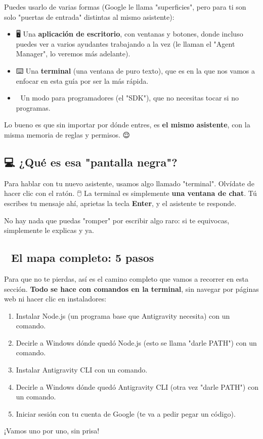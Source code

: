 \documentclass[12pt]{article}
\begin{document}
Puedes usarlo de varias formas (Google le llama "superficies", pero para ti son solo "puertas de entrada" distintas al mismo asistente):
\begin{itemize}
    \item 🖥️ Una \textbf{aplicación de escritorio}, con ventanas y botones, donde incluso puedes ver a varios ayudantes trabajando a la vez (le llaman el "Agent Manager", lo veremos más adelante).
    \item ⌨️ Una \textbf{terminal} (una ventana de puro texto), que es en la que nos vamos a enfocar en esta guía por ser la más rápida.
    \item 🧩 Un modo para programadores (el "SDK"), que no necesitas tocar si no programas.
\end{itemize}
Lo bueno es que sin importar por dónde entres, es \textbf{el mismo asistente}, con la misma memoria de reglas y permisos. 😌

\subsection{💻 ¿Qué es esa "pantalla negra"?}
Para hablar con tu nuevo asistente, usamos algo llamado "terminal". Olvídate de hacer clic con el ratón. 🖱️ La terminal es simplemente \textbf{una ventana de chat}. Tú escribes tu mensaje ahí, aprietas la tecla \textbf{Enter}, y el asistente te responde. 💬

No hay nada que puedas "romper" por escribir algo raro: si te equivocas, simplemente le explicas y ya. 🙂

\subsection{🧭 El mapa completo: 5 pasos}
Para que no te pierdas, así es el camino completo que vamos a recorrer en esta sección. \textbf{Todo se hace con comandos en la terminal}, sin navegar por páginas web ni hacer clic en instaladores:
\begin{enumerate}
    \item Instalar Node.js (un programa base que Antigravity necesita) con un comando.
    \item Decirle a Windows dónde quedó Node.js (esto se llama "darle PATH") con un comando.
    \item Instalar Antigravity CLI con un comando.
    \item Decirle a Windows dónde quedó Antigravity CLI (otra vez "darle PATH") con un comando.
    \item Iniciar sesión con tu cuenta de Google (te va a pedir pegar un código).
\end{enumerate}
¡Vamos uno por uno, sin prisa! 🐢
\end{document}
